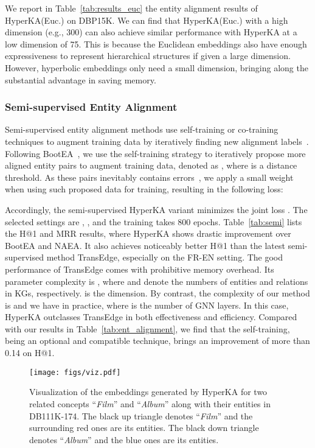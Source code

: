 \documentclass[11pt,a4paper]{article}
\newcommand{\modelname}{HyperKA\xspace}
\begin{document}
We report in Table~\ref{tab:results_euc} the entity alignment results of \modelname (Euc.) on DBP15K. We can find that \modelname (Euc.) with a high dimension (e.g., 300) can also achieve similar performance with \modelname at a low dimension of 75. This is because the Euclidean embeddings also have enough expressiveness to represent hierarchical structures if given a large dimension. However, hyperbolic embeddings only need a small dimension, bringing along the substantial advantage in saving memory.

\subsubsection{Semi-supervised Entity Alignment}
\label{sect:semi}
Semi-supervised entity alignment methods use self-training or co-training techniques to augment training data by iteratively finding new alignment labels~\cite{BootEA,NAEA,TransEdge}. Following BootEA~\cite{BootEA}, we use the self-training strategy to iteratively propose more aligned entity pairs to augment training data, denoted as , where  is a distance threshold. As these pairs inevitably contains errors~\cite{BootEA}, we apply a small weight  when using such proposed data for training, resulting in the following loss:


Accordingly, the semi-supervised \modelname variant minimizes the joint loss . The selected settings are , , and the training takes 800 epochs. Table~\ref{tab:semi} lists the H@1 and MRR results, where \modelname shows drastic improvement over BootEA and NAEA. It also achieves noticeably better H@1 than the latest semi-supervised method TransEdge, especially on the FR-EN setting. The good performance of TransEdge comes with prohibitive memory overhead. Its parameter complexity is  \cite{TransEdge}, where  and  denote the numbers of entities and relations in KGs, respectively.  is the dimension. By contrast, the complexity of our method is  and we have  in practice, where  is the number of GNN layers. In this case, \modelname outclasses TransEdge in both effectiveness and efficiency. Compared with our results in Table~\ref{tab:ent_alignment}, we find that the self-training, being an optional and compatible technique, brings an improvement of more than 0.14 on H@1.

\begin{figure}[!t]
	\centering
	\texttt{[image: figs/viz.pdf]}
	\caption{Visualization of the embeddings generated by \modelname for two related concepts ``\textit{Film}'' and ``\textit{Album}'' along with their entities in DB111K-174. The black up triangle denotes ``\textit{Film}'' and the surrounding red ones are its entities. The black down triangle denotes ``\textit{Album}'' and the blue ones are its entities.}\label{fig:viz}
\end{figure}
\end{document}
